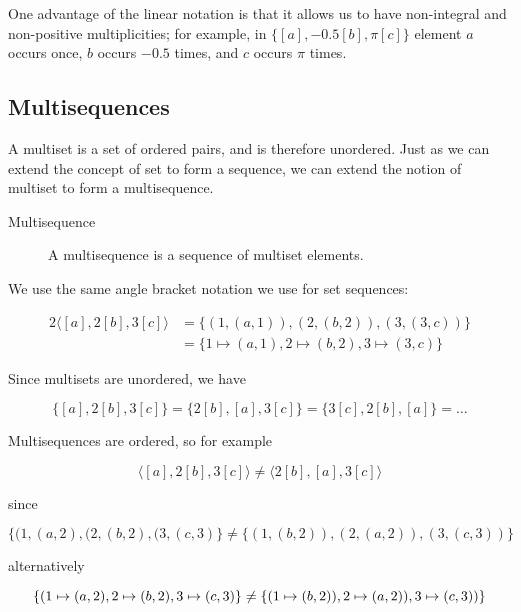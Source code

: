 \documentclass[reqno,12pt]{article}
\numberwithin{equation}{subsection}
\begin{document}
One advantage of the linear notation is that it allows us to have
non-integral and non-positive multiplicities; for example, in
$\{[a],-0.5[b],\pi[c]\}$ element $a$ occurs once, $b$ occurs $-0.5$
times, and $c$ occurs $\pi$ times.

\subsection{Multisequences}

A multiset is a set of ordered pairs, and is therefore unordered.
Just as we can extend the concept of set to form a sequence, we can
extend the notion of multiset to form a multisequence.

\begin{description}
\item [Multisequence]  A multisequence is a sequence of multiset elements.
\end{description}

We use the same angle bracket notation we use for set sequences:

\begin{alignat}{2}
  \langle [a],2[b],3[c]\rangle &= \{(1, (a,1)), (2,(b,2)), (3,(3,c))\} \\
  &= \{1\mapsto (a,1), 2\mapsto (b,2), 3\mapsto (3,c)\}
\end{alignat}


Since multisets are unordered, we have

\begin{equation}
  \{[a],2[b],3[c]\} = \{2[b],[a],3[c]\} = \{3[c],2[b],[a]\} = \ldots
\end{equation}

Multisequences are ordered, so for example

\begin{equation}
  \langle [a],2[b],3[c]\rangle \neq \langle2[b],[a],3[c]\rangle
\end{equation}

\noindent since

\begin{equation}
  \{(1,(a,2), (2,(b,2), (3,(c,3)\}\neq \{(1,(b,2)), (2,(a,2)), (3,(c,3))\}
\end{equation}

\noindent alternatively

\begin{equation}
  \{(1\mapsto (a,2), 2\mapsto (b,2), 3\mapsto (c,3)\}\\
  \neq \{(1\mapsto (b,2)), 2\mapsto (a,2)), 3\mapsto (c,3))\}
\end{equation}
\end{document}
